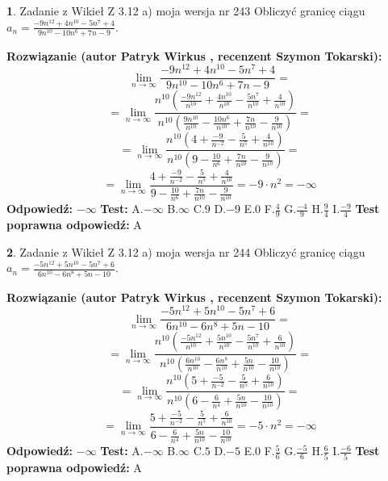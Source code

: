 \documentclass[12pt, a4paper]{article}
\theoremstyle{definition} %
\newtheorem{zad}{}
\newcommand{\zadStart}[1]{\begin{zad}#1\newline}
\newcommand{\zadStop}{\end{zad}}
\newcommand{\rozwStart}[2]{\noindent \textbf{Rozwiązanie (autor #1 , recenzent #2): }\newline}
\newcommand{\rozwStop}{\newline}
\newcommand{\odpStart}{\noindent \textbf{Odpowiedź:}\newline}
\newcommand{\odpStop}{\newline}
\newcommand{\testStart}{\noindent \textbf{Test:}\newline}
\newcommand{\testStop}{\newline}
\newcommand{\kluczStart}{\noindent \textbf{Test poprawna odpowiedź:}\newline}
\newcommand{\kluczStop}{\newline}
\begin{document}
\zadStart{Zadanie z Wikieł Z 3.12 a) moja wersja nr 243}
Obliczyć granicę ciągu $a_{n}=\frac{-9n^{12}+4n^{10}-5n^{7}+4}{9n^{10}-10n^{6}+7n-9}$.
\zadStop
\rozwStart{Patryk Wirkus}{Szymon Tokarski}
$$\lim\limits_{n\to\infty}\frac{-9n^{12}+4n^{10}-5n^{7}+4}{9n^{10}-10n^{6}+7n-9}=$$
$$=\lim\limits_{n\to\infty}\frac{n^{10}\left(\frac{-9n^{12}}{n^{10}}+\frac{4n^{10}}{n^{10}}-\frac{5n^{7}}{n^{10}}+\frac{4}{n^{10}}\right)}{n^{10}\left(\frac{9n^{10}}{n^{10}}-\frac{10n^{6}}{n^{10}}+\frac{7n}{n^{10}}-\frac{9}{n^{10}}\right)}=$$
$$=\lim\limits_{n\to\infty}\frac{n^{10}\left(4+\frac{-9}{n^{-2}}-\frac{5}{n^{5}}+\frac{4}{n^{10}}\right)}
{n^{10}\left(9-\frac{10}{n^{6}}+\frac{7n}{n^{10}}-\frac{9}{n^{10}}\right)}=$$
$$=\lim\limits_{n\to\infty}\frac{4+\frac{-9}{n^{-2}}-\frac{5}{n^{5}}+\frac{4}{n^{10}}}{9-\frac{10}{n^{6}}+\frac{7n}{n^{10}}-\frac{9}{n^{10}}}=-9\cdot n^{2} = -\infty$$
\rozwStop
\odpStart
$-\infty$
\odpStop
\testStart
A.$-\infty$
B.$\infty$
C.$9$
D.$-9$
E.$0$
F.$\frac{4}{9}$
G.$\frac{-4}{9}$
H.$\frac{9}{4}$
I.$\frac{-9}{4}$
\testStop
\kluczStart
A
\kluczStop



\zadStart{Zadanie z Wikieł Z 3.12 a) moja wersja nr 244}
Obliczyć granicę ciągu $a_{n}=\frac{-5n^{12}+5n^{10}-5n^{7}+6}{6n^{10}-6n^{8}+5n-10}$.
\zadStop
\rozwStart{Patryk Wirkus}{Szymon Tokarski}
$$\lim\limits_{n\to\infty}\frac{-5n^{12}+5n^{10}-5n^{7}+6}{6n^{10}-6n^{8}+5n-10}=$$
$$=\lim\limits_{n\to\infty}\frac{n^{10}\left(\frac{-5n^{12}}{n^{10}}+\frac{5n^{10}}{n^{10}}-\frac{5n^{7}}{n^{10}}+\frac{6}{n^{10}}\right)}{n^{10}\left(\frac{6n^{10}}{n^{10}}-\frac{6n^{8}}{n^{10}}+\frac{5n}{n^{10}}-\frac{10}{n^{10}}\right)}=$$
$$=\lim\limits_{n\to\infty}\frac{n^{10}\left(5+\frac{-5}{n^{-2}}-\frac{5}{n^{5}}+\frac{6}{n^{10}}\right)}
{n^{10}\left(6-\frac{6}{n^{4}}+\frac{5n}{n^{10}}-\frac{10}{n^{10}}\right)}=$$
$$=\lim\limits_{n\to\infty}\frac{5+\frac{-5}{n^{-2}}-\frac{5}{n^{5}}+\frac{6}{n^{10}}}{6-\frac{6}{n^{4}}+\frac{5n}{n^{10}}-\frac{10}{n^{10}}}=-5\cdot n^{2} = -\infty$$
\rozwStop
\odpStart
$-\infty$
\odpStop
\testStart
A.$-\infty$
B.$\infty$
C.$5$
D.$-5$
E.$0$
F.$\frac{5}{6}$
G.$\frac{-5}{6}$
H.$\frac{6}{5}$
I.$\frac{-6}{5}$
\testStop
\kluczStart
A
\kluczStop
\end{document}
